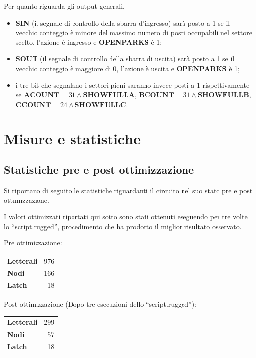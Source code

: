 \documentclass[
  12pt,
  a4paper,
  headings=optiontoheadandtoc
]{scrreprt}
\begin{document}
Per quanto riguarda gli output generali,
\begin{itemize}
  \item \textbf{SIN} (il segnale di controllo della sbarra d'ingresso) sarà posto a 1 se il vecchio conteggio è minore del massimo numero di posti occupabili nel settore scelto, l'azione è ingresso e \textbf{OPENPARKS} è 1;
  \item \textbf{SOUT} (il segnale di controllo della sbarra di uscita) sarà posto a 1 se il vecchio conteggio è maggiore di 0, l'azione è uscita e \textbf{OPENPARKS} è 1;
  \item i tre bit che segnalano i settori pieni saranno invece posti a 1 rispettivamente se \(\textbf{ACOUNT}=31 \wedge \textbf{SHOWFULLA}\), \(\textbf{BCOUNT}=31 \wedge \textbf{SHOWFULLB}\), \(\textbf{CCOUNT}=24 \wedge \textbf{SHOWFULLC}\).
\end{itemize}

\chapter[nonumber=true]{Misure e statistiche}

\section[nonumber=true]{Statistiche pre e post ottimizzazione}

Si riportano di seguito le statistiche riguardanti il circuito nel suo stato pre e post ottimizzazione.

I valori ottimizzati riportati qui sotto sono stati ottenuti eseguendo per tre volte lo ``script.rugged'', procedimento che ha prodotto il miglior risultato osservato.

Pre ottimizzazione:

\begin{tabularx}{150pt}{X|r}
\textbf{Letterali} & 976 \\
\textbf{Nodi} & 166 \\
\textbf{Latch} & 18
\end{tabularx}

Post ottimizzazione (Dopo tre esecuzioni dello ``script.rugged''):

\begin{tabularx}{150pt}{X|r}
\textbf{Letterali} & 299 \\
\textbf{Nodi} & 57 \\
\textbf{Latch} & 18
\end{tabularx}
\end{document}
